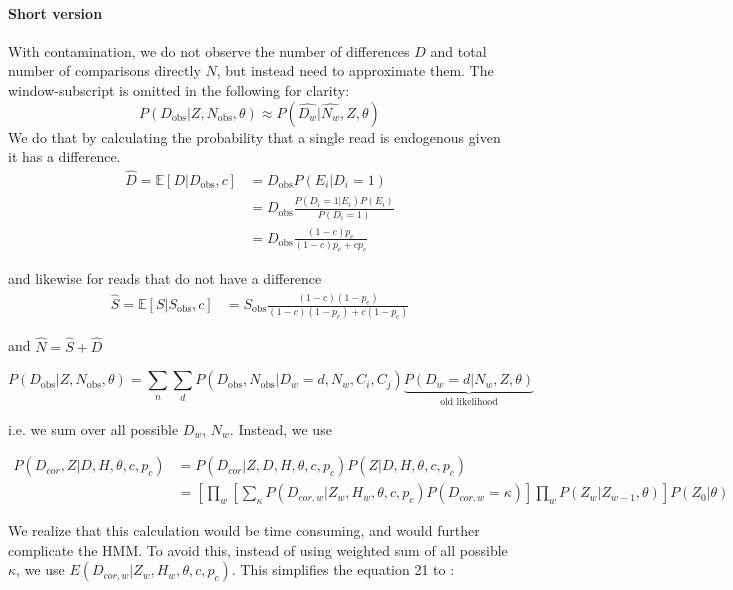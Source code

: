 \documentclass[12pt, letterpaper]{article}
\begin{document}
\paragraph{Short version}
With contamination, we do not observe the number of differences $D$ and total number of comparisons directly $N$, but instead need to approximate them. The window-subscript is omitted in the following for clarity:
\begin{equation}
    P(D_{\text{obs}} | Z, N_\text{obs}, \theta) \approx 
    P( \hat{D_w} | \hat{N_w}, Z, \theta)
\end{equation}
We do that by calculating the probability that a single read is endogenous given it has a difference.
\begin{align}
    \hat{D} = \mathbb{E}[D | D_{\text{obs}}, c] &= 
    D_{\text{obs}} P(E_i | D_i=1) \\
    &= D_\text{obs} \frac{P(D_i=1 | E_i)P(E_i)}{P(D_i=1)}\\
    &= D_\text{obs} \frac{(1-c)p_e}{(1-c)p_e + c p_c}
\end{align}

and likewise for reads that do not have a difference
\begin{align}
    \hat{S} = \mathbb{E}[S | S_{\text{obs}}, c] &= 
     S_\text{obs} \frac{(1-c)(1-p_e)}{(1-c)(1-p_e) + c (1-p_c)}
\end{align}

and $\hat{N} = \hat{S} + \hat{D}$

\begin{equation}
    P(D_{\text{obs}} | Z, N_\text{obs}, \theta) = \sum_n\sum_d P(D_{\text{obs}}, N_\text{obs} | D_w=d, N_w, C_i, C_j)\underbrace{P(D_w=d | N_w, Z, \theta)}_\text{old likelihood}
\end{equation}

i.e. we sum over all possible $D_w$, $N_w$. Instead, we use

\begin{align}
    P(D_{cor},Z|D,H,\theta,c,p_c) &= P(D_{cor}|Z,D,H,\theta,c,p_c) P(Z|D,H,\theta,c,p_c)\nonumber\\
    &= [\prod_{w} [\sum_\kappa P(D_{cor,w}|Z_w, H_w, \theta,c,p_c) P(D_{cor,w}=\kappa)] \prod_{w} P(Z_w|Z_{w-1}, \theta)] P(Z_0| \theta)
\end{align}



We realize that this calculation would be time consuming, and would further complicate the HMM. To avoid this, instead of using weighted sum of all possible $\kappa$, we use $E(D_{cor,w}|Z_w, H_w, \theta,c,p_c)$. This simplifies the equation 21 to :
\end{document}

